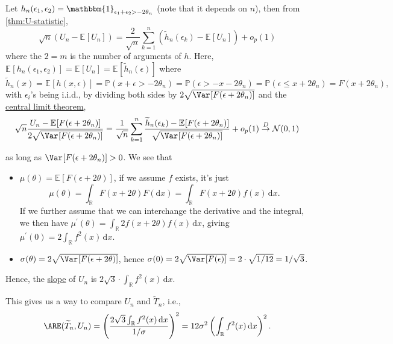 \begin{explanation}
	Let \(h_n(\epsilon _1, \epsilon _2) = \mathbbm{1}_{\epsilon _1 + \epsilon _2 > - 2 \theta _n} \) (note that it depends on \(n\)), then from \autoref{thm:U-statistic},
	\[
		\sqrt{n} \left( U_n - \mathbb{E}_{}[U_n] \right)
		= \frac{2}{\sqrt{n} } \sum_{k=1}^{n} \left( \widetilde{h} _n(\epsilon _k) - \mathbb{E}_{}[U_n] \right) + o_p(1)
	\]
	where the \(2 = m\) is the number of arguments of \(h\). Here, \(\mathbb{E}_{}[h_n(\epsilon _1, \epsilon _2)] = \mathbb{E}_{}[U_n] = \mathbb{E}_{}[\widetilde{h} _n (\epsilon )] \) where
	\[
		\widetilde{h} _n(x)
		= \mathbb{E}_{}[h(x, \epsilon )]
		= \mathbb{P} (x + \epsilon > - 2\theta _n)
		= \mathbb{P} (\epsilon > -x - 2\theta _n)
		= \mathbb{P} (\epsilon \leq x + 2 \theta _n)
		= F(x + 2 \theta _n),
	\]
	with \(\epsilon _i\)'s being i.i.d., by dividing both sides by \(2 \sqrt{\Var_{}[F(\epsilon + 2 \theta _n)] } \) and the \hyperref[thm:CLT]{central limit theorem},
	\[
		\sqrt{n} \frac{U_n - \mathbb{E}_{}[F(\epsilon + 2 \theta _n)] }{2 \sqrt{\Var_{}[F(\epsilon + 2 \theta _n)] } }
		= \frac{1}{\sqrt{n} } \sum_{k=1}^{n} \frac{\widetilde{h} _n(\epsilon _k) - \mathbb{E}_{}[F(\epsilon + 2 \theta _n)] }{\sqrt{\Var_{}[F(\epsilon + 2 \theta _n)] } } + o_p(1)
		\overset{D}{\to} \mathcal{N} (0, 1)
	\]

	as long as \(\Var_{}[F(\epsilon + 2 \theta _n)] > 0\). We see that
	\begin{itemize}
		\item \(\mu (\theta ) = \mathbb{E}_{}[F(\epsilon + 2 \theta )] \), if we assume \(f\) exists, it's just
		      \[
			      \mu (\theta ) = \int_{\mathbb{R} } F(x + 2 \theta ) F(\mathrm{d} x)
			      = \int_{\mathbb{R} } F(x + 2 \theta ) f(x) \,\mathrm{d} x.
		      \]
		      If we further assume that we can interchange the derivative and the integral, we then have \(\mu ^{\prime} (\theta ) = \int_{\mathbb{R} } 2 f(x + 2\theta ) f(x) \,\mathrm{d} x\), giving \(\mu ^{\prime} (0) = 2 \int_{\mathbb{R}} f^2(x) \,\mathrm{d} x\).
		\item \(\sigma (\theta ) = 2 \sqrt{\Var_{}[F(\epsilon + 2 \theta )] } \), hence \(\sigma (0) = 2 \sqrt{\Var_{}[F(\epsilon )]} = 2 \cdot \sqrt{1 / 12} = 1 / \sqrt{3}  \).
	\end{itemize}
	Hence, the \hyperref[def:slope]{slope} of \(U_n\) is \(2 \sqrt{3} \cdot \int_{\mathbb{R}} f^2(x) \,\mathrm{d} x\).
\end{explanation}

This gives us a way to compare \(U_n\) and \(\widetilde{T} _n\), i.e.,
\[
	\ARE(\widetilde{T} _n, U_n)
	= \left( \frac{2 \sqrt{3} \int_{\mathbb{R} } f^2(x)\,\mathrm{d} x}{1 / \sigma } \right) ^2
	= 12 \sigma ^2 \left( \int_{\mathbb{R} } f^2(x) \,\mathrm{d} x \right) ^2.
\]